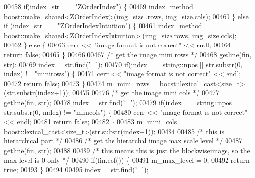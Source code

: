 \begin{DoxyCode}
00458                 \textcolor{keywordflow}{if}(index\_str == \textcolor{stringliteral}{"ZOrderIndex"}) \{
00459                         index\_method = boost::make\_shared<ZOrderIndex>(img\_size
      .rows, img\_size.cols);
00460                 \} \textcolor{keywordflow}{else} \textcolor{keywordflow}{if} (index\_str == \textcolor{stringliteral}{"ZOrderIndexIntuition"}) \{
00461                         index\_method = boost::make\_shared<ZOrderIndexIntuition>
      (img\_size.rows, img\_size.cols);
00462                 \} \textcolor{keywordflow}{else} \{
00463                         cerr << \textcolor{stringliteral}{"image format is not correct"} << endl;
00464                         \textcolor{keywordflow}{return} \textcolor{keyword}{false};
00465                 \}
00466 
00467         \textcolor{comment}{/* get the image mini rows */}
00468         getline(fin, str);
00469         index = str.find(\textcolor{charliteral}{'='});
00470         \textcolor{keywordflow}{if}(index == string::npos || str.substr(0, index) != \textcolor{stringliteral}{"minirows"}) \{
00471             cerr << \textcolor{stringliteral}{"image format is not correct"} << endl;
00472             \textcolor{keywordflow}{return} \textcolor{keyword}{false};
00473         \}
00474         m\_mini\_rows = boost::lexical\_cast<\textcolor{keywordtype}{size\_t}>(str.substr(index+1));
00475 
00476         \textcolor{comment}{/* get the image mini cols */}
00477         getline(fin, str);
00478         index = str.find(\textcolor{charliteral}{'='});
00479         \textcolor{keywordflow}{if}(index == string::npos || str.substr(0, index) != \textcolor{stringliteral}{"minicols"}) \{
00480             cerr << \textcolor{stringliteral}{"image format is not correct"} << endl;
00481             \textcolor{keywordflow}{return} \textcolor{keyword}{false};
00482         \}
00483         m\_mini\_cols = boost::lexical\_cast<\textcolor{keywordtype}{size\_t}>(str.substr(index+1));
00484 
00485                 \textcolor{comment}{/* this is hierarchical part */}
00486         \textcolor{comment}{/* get the hierarchal image max scale level */}
00487         getline(fin, str);
00488 
00489                 \textcolor{comment}{/* this means this is just the blockwiseimage, so the max level
       is 0 only */}
00490                 \textcolor{keywordflow}{if}(fin.eof()) \{
00491                         m\_max\_level = 0;
00492                         \textcolor{keywordflow}{return} \textcolor{keyword}{true};
00493                 \}
00494 
00495         index = str.find(\textcolor{charliteral}{'='});

\end{DoxyCode}
